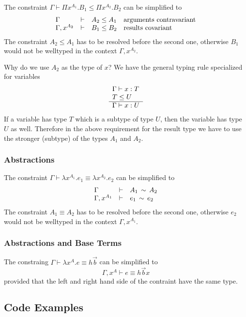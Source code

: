 The constraint $\Gamma \vdash \Pi x^{A_1}. B_1 \le \Pi x^{A_2}. B_2$ can be
simplified to
$$
    \begin{array}{lllll} 
        \Gamma          & \vdash & A_2 \le A_1
        &\text{arguments contravariant}
        \\
        \Gamma, x^{A_2} & \vdash & B_1 \le B_2
        &\text{results covariant}
     \end{array}
$$
%
The constraint $A_2 \le A_1$ has to be resolved before the second one,
otherwise $B_1$ would not be welltyped in the context $\Gamma, x^{A_2}$.

Why do we use $A_2$ as the type of $x$? We have the general typing rule
specialized for variables
$$
    \begin{array}{l} 
        \Gamma \vdash x : T
        \\
        T \le U
     \\ \hline 
        \Gamma \vdash x: U
     \end{array}
$$
If a variable has type $T$ which is a subtype of type $U$, then the variable has
type $U$ as well. Therefore in the above requirement for the result type we have
to use the stronger (subtype) of the types $A_1$ and $A_2$.




\subsubsection{Abstractions}

The constraint $\Gamma \vdash \lambda x^{A_1}. e_1 \equiv \lambda x^{A_2}. e_2$
can be simplified to
$$
    \begin{array}{lllll} 
        \Gamma          & \vdash & A_1 \, \sim \, A_2
        \\
        \Gamma, x^{A_1} & \vdash & e_1 \, \sim \, e_2
     \end{array}
$$
%
The constraint $A_1 \equiv A_2$ has to be resolved before the second one,
otherwise $e_2$ would not be welltyped in the context $\Gamma, x^{A_1}$.




\subsubsection{Abstractions and Base Terms}

The constraing $\Gamma \vdash \lambda x^A.e \equiv h \vec b$ can be simplified
to
$$
    \Gamma, x^A \vdash e \equiv h \vec b x
$$
provided that the left and right hand side of the contraint have the same type.






\subsection{Code Examples}



